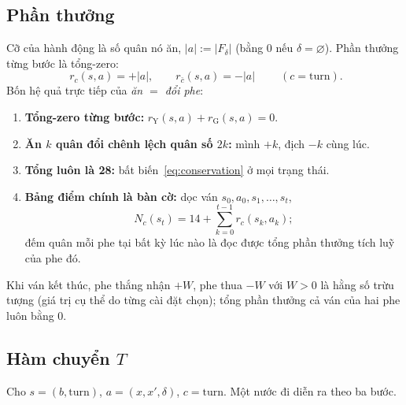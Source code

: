 \subsection{Phần thưởng}
\label{ssec:reward}

Cỡ của hành động là số quân nó ăn, $|a|:=|F_\delta|$ (bằng $0$ nếu
$\delta=\varnothing$). Phần thưởng từng bước là tổng-zero:
\begin{equation}
\boxed{\;r_c(s,a)=+|a|,\qquad r_{\bar c}(s,a)=-|a|\;}
\qquad (c=\mathrm{turn}).
\label{eq:reward}
\end{equation}
Bốn hệ quả trực tiếp của \emph{ăn $=$ đổi phe}:
\begin{enumerate}[label=(\arabic*),noitemsep,topsep=2pt]
  \item \textbf{Tổng-zero từng bước:} $r_{\mathrm Y}(s,a)+r_{\mathrm G}(s,a)=0$.
  \item \textbf{Ăn $k$ quân đổi chênh lệch quân số $2k$:} mình $+k$,
        địch $-k$ cùng lúc.
  \item \textbf{Tổng luôn là 28:} bất biến~\eqref{eq:conservation} ở mọi
        trạng thái.
  \item \textbf{Bảng điểm chính là bàn cờ:} dọc ván
        $s_0,a_0,s_1,\dots,s_t$,
        \begin{equation}
        N_c(s_t)=14+\sum_{k=0}^{t-1} r_c(s_k,a_k);
        \label{eq:scoreboard}
        \end{equation}
        đếm quân mỗi phe tại bất kỳ lúc nào là đọc được tổng phần thưởng
        tích luỹ của phe đó.
\end{enumerate}
Khi ván kết thúc, phe thắng nhận $+W$, phe thua $-W$ với $W>0$ là hằng số
trừu tượng (giá trị cụ thể do từng cài đặt chọn); tổng phần thưởng cả ván
của hai phe luôn bằng $0$.

\subsection{Hàm chuyển $T$}
\label{ssec:transition}

Cho $s=(b,\mathrm{turn})$, $a=(x,x',\delta)$, $c=\mathrm{turn}$. Một
nước đi diễn ra theo ba bước.

